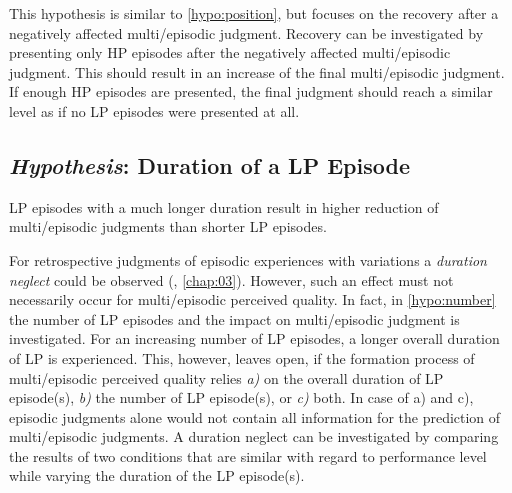 This hypothesis is similar to \autoref{hypo:position}, but focuses on the recovery after a negatively affected multi\-/episodic judgment.
Recovery can be investigated by presenting only \ac{HP} episodes after the negatively affected multi\-/episodic judgment.
This should result in an increase of the final multi\-/episodic judgment.
If enough \ac{HP} episodes are presented, the final judgment should reach a similar level as if no \ac{LP} episodes were presented at all.

\subsection[H6: Duration of a \acs{LP} Episode]{\emph{Hypothesis}: Duration of a \acs{LP} Episode}
\begin{hypothesis}\label{hypo:duration}
\ac{LP} episodes with a much longer duration result in higher reduction of multi\-/episodic judgments than shorter \ac{LP} episodes.
\end{hypothesis}

For retrospective judgments of episodic experiences with variations a \emph{duration neglect} could be observed (\cf, \autoref{chap:03}).
However, such an effect must not necessarily occur for multi\-/episodic perceived quality.
In fact, in \autoref{hypo:number} the number of \ac{LP} episodes and the impact on multi\-/episodic judgment is investigated.
For an increasing number of \ac{LP} episodes, a longer overall duration of \ac{LP} is experienced.
This, however, leaves open, if the formation process of multi\-/episodic perceived quality relies \emph{a)} on the overall duration of \ac{LP} episode(s), \emph{b)} the number of \ac{LP} episode(s), or \emph{c)} both.
In case of a) and c), episodic judgments alone would not contain all information for the prediction of multi\-/episodic judgments.
A duration neglect can be investigated by comparing the results of two conditions that are similar with regard to performance level while varying the duration of the \ac{LP} episode(s).

